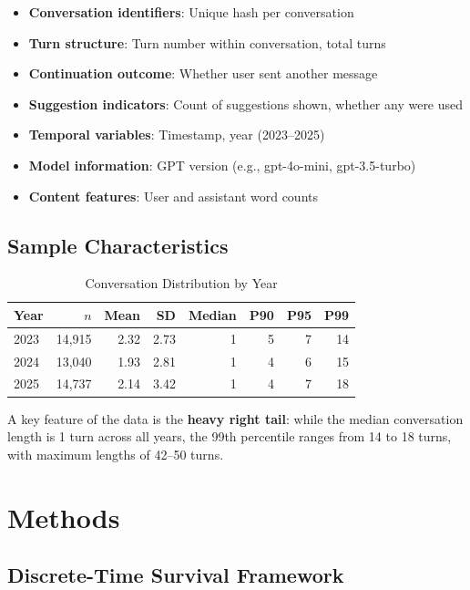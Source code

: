 \documentclass[11pt]{article}
\begin{document}
\begin{itemize}
    \item \textbf{Conversation identifiers}: Unique hash per conversation
    \item \textbf{Turn structure}: Turn number within conversation, total turns
    \item \textbf{Continuation outcome}: Whether user sent another message
    \item \textbf{Suggestion indicators}: Count of suggestions shown, whether any were used
    \item \textbf{Temporal variables}: Timestamp, year (2023--2025)
    \item \textbf{Model information}: GPT version (e.g., gpt-4o-mini, gpt-3.5-turbo)
    \item \textbf{Content features}: User and assistant word counts
\end{itemize}

\subsection{Sample Characteristics}

\begin{table}[h]
\centering
\caption{Conversation Distribution by Year}
\label{tab:desc_stats}
\begin{tabular}{lrrrrrrr}
\toprule
Year & $n$ & Mean & SD & Median & P90 & P95 & P99 \\
\midrule
2023 & 14,915 & 2.32 & 2.73 & 1 & 5 & 7 & 14 \\
2024 & 13,040 & 1.93 & 2.81 & 1 & 4 & 6 & 15 \\
2025 & 14,737 & 2.14 & 3.42 & 1 & 4 & 7 & 18 \\
\bottomrule
\end{tabular}
\end{table}

A key feature of the data is the \textbf{heavy right tail}: while the median conversation length is 1 turn across all years, the 99th percentile ranges from 14 to 18 turns, with maximum lengths of 42--50 turns.

\section{Methods}

\subsection{Discrete-Time Survival Framework}
\end{document}
